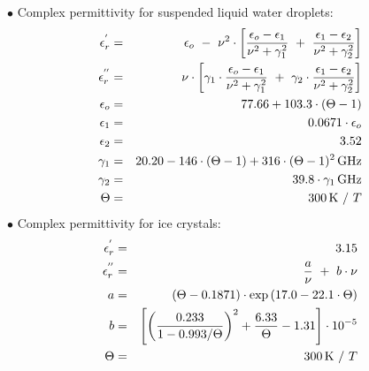 \noindent$\bullet$ Complex permittivity for suspended liquid water droplets:
\begin{eqnarray}
  \label{eq:comp_perm_lwc}
  \ree       & = & \epsilon_o~-~\nu^2\cdot
                   \left[\frac{\epsilon_o-\epsilon_1}{\nu^2+\gamma_1^2}~+~
                   \frac{\epsilon_1-\epsilon_2}{\nu^2+\gamma_2^2}\right]\nonumber\\
%
  \ime       & = & \nu\cdot\left[\gamma_1\cdot
                   \frac{\epsilon_o-\epsilon_1}{\nu^2+\gamma_1^2}~+~
                   \gamma_2\cdot\frac{\epsilon_1-\epsilon_2}{\nu^2+\gamma_2^2}\right]\nonumber\\
%
  \label{eq:comp_perm_lwc_epsilon_0}
  \epsilon_o & = & 77.66 + 103.3\cdot(\Theta-1)\\
  \epsilon_1 & = & 0.0671\cdot\epsilon_o\nonumber\\
  \epsilon_2 & = & 3.52\nonumber\\
%
  \label{eq:comp_perm_lwc_gamma_1}
  \gamma_1   & = & 20.20 - 146\cdot(\Theta-1) + 316\cdot(\Theta-1)^2\,\mbox{GHz}\\
  \gamma_2   & = & 39.8\cdot\gamma_1\,\mbox{GHz}\nonumber\\
%
  \Theta     & = & 300\,\mbox{K}~/~T\nonumber
%
\end{eqnarray}
$\bullet$ Complex permittivity for ice crystals:
\begin{eqnarray}
  \label{eq:comp_perm_iwc}
  \ree    & = & 3.15\nonumber\\
%
  \ime    & = & \frac{a}{\nu}~+~b\cdot\nu\nonumber\\
%
  \label{eq:comp_perm_iwc_a}
  a       & = & (\Theta-0.1871)\cdot\exp{(17.0-22.1\cdot\Theta)}\\
  \label{eq:comp_perm_iwc_b}
  b       & = & \left[\left(\frac{0.233}{1-0.993/\Theta}\right)^2 + 
                \frac{6.33}{\Theta} - 1.31\right]\cdot10^{-5}\\
%
  \Theta  & = & 300\,\mbox{K}~/~T\nonumber
%
\end{eqnarray}
